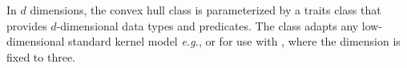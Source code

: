 
In $d$ dimensions, the convex hull class  is
parameterized by a traits class that provides $d$-dimensional data
types and predicates.  The class  adapts
any low-dimensional standard kernel model \textit{e.g.},
 or  for use with
, where the dimension is fixed to three.


